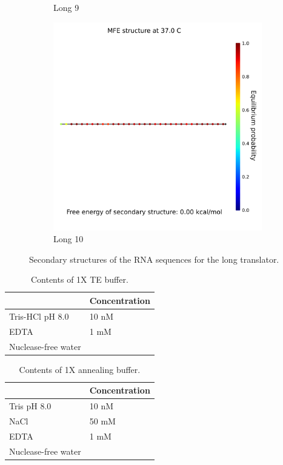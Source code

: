 \begin{figure}[h]
\begin{subfigure}{.32\columnwidth}
  \caption{Long 9}
\end{subfigure}
\begin{subfigure}{.32\columnwidth}
  \centering
  \includegraphics[width=\linewidth]{images/long_rna_secondarystructure_10.png}
  \caption{Long 10}
\end{subfigure}
\caption{Secondary structures of the RNA sequences for the long translator.}
\label{long_secondary_structures}
\end{figure}

\begin{table}[h]
\centering
\begin{tabular}{ll}
  \hline
\textbf{}           & \textbf{Concentration} \\
\hline
Tris-HCl pH 8.0     & 10 nM                  \\
EDTA                & 1 mM                   \\
Nuclease-free water &               \\
\hline
\end{tabular}
\caption{Contents of 1X TE buffer.}
\label{te_buffer}
\end{table}

\begin{table}[h]
\centering
\begin{tabular}{ll}
  \hline
\textbf{}           & \textbf{Concentration} \\
\hline
Tris pH 8.0     & 10 nM                  \\
NaCl                & 50 mM                   \\
EDTA                & 1 mM                   \\
Nuclease-free water &               \\
\hline
\end{tabular}
\caption{Contents of 1X annealing buffer.}
\label{annealing_buffer}
\end{table}

